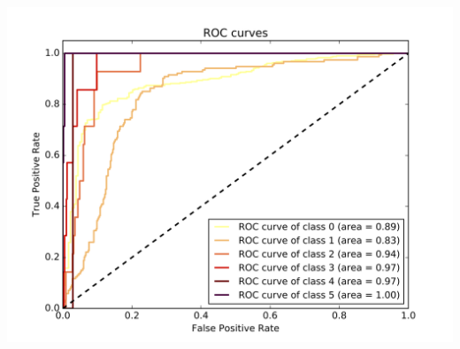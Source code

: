 \documentclass[c]{beamer}
\begin{document}
\begin{frame}
\begin{columns}
\begin{column}{0.6\textwidth}
       \centering\vfill
      \includegraphics[scale=0.18]{../../data/Belgique/test/Neural_Network_Classification-oversampling/Neural_Network_Classification-oversampling_roc.png}
\end{column}
\end{columns}
\end{frame}
\end{document}
